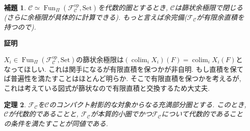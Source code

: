 \documentclass{ltjsarticle}
\makeatletter
\theoremstyle{mystyle}
\newtheorem{theorem}{定理}[section]
\newtheorem{lemma}[theorem]{補題}
\renewcommand{\proofname}{\textbf{証明}}
\renewenvironment{proof}[1][\proofname]{\par
  \pushQED{\qed}
  \normalfont \topsep6\p@\@plus6\p@\relax
  \trivlist
  \item\relax
  {#1\@addpunct{\newline\ignorespaces}}%
}{
  \popQED\endtrivlist\@endpefalse
}
\DeclareMathOperator{\Fun}{Fun}
\DeclareMathOperator{\colim}{colim}
\makeatother
\begin{document}
\begin{lemma}
  $\mathcal C\simeq\Fun_{\Pi}(\mathcal F_{\mathcal C}^{\mathrm{op}},\mathrm{Set})$を代数的圏とするとき, $\mathcal C$は篩状余極限で閉じる(さらに余極限が具体的に計算できる).
  もっと言えば余完備($\mathcal F_{\mathcal C}$が有限余直積を持つので).
\end{lemma}
\begin{proof}
  $X_i\in\Fun_{\Pi}(\mathcal F_{\mathcal C}^{\mathrm{op}},\mathrm{Set})$の篩状余極限は$(\colim_{i}X_i)(F)=\colim_{i}X_i(F)$となってほしい.
  これは関手になるが有限直積を保つかが非自明. もし直積を保てば普遍性を満たすことはほとんど明らか.
  そこで有限直積を保つかを考えるが, これは考えている図式が篩状なので有限直積と交換するため大丈夫.
\end{proof}
\begin{theorem}\label{RedToProj}
  $\mathcal F_{\mathcal C}$を$\mathcal C$のコンパクト射影的な対象からなる充満部分圏とする.
  このとき, $\mathcal C$が代数的であることと, $\mathcal F_{\mathcal C}$が本質的小圏でかつ$\mathcal F_{\mathcal C}$について代数的であることの条件を満たすことが同値である.
\end{theorem}
\end{document}
